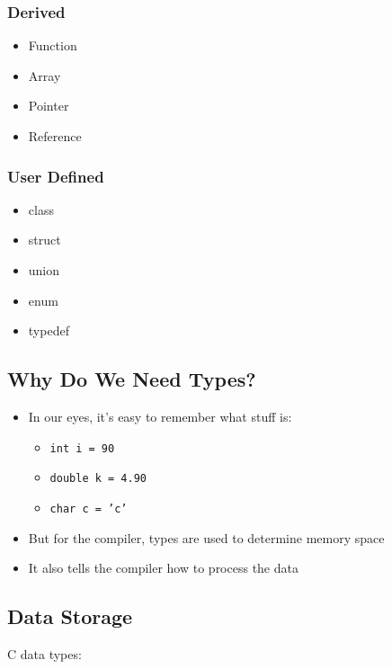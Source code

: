 \documentclass[11pt,a4paper]{article}
\begin{document}
\subsubsection{Derived}
\begin{itemize}
    \item Function
    \item Array
    \item Pointer
    \item Reference
\end{itemize}

\subsubsection{User Defined}
\begin{itemize}
    \item class
    \item struct
    \item union
    \item enum
    \item typedef
\end{itemize}

\subsection{Why Do We Need Types?}

\begin{itemize}
    \item In our eyes, it's easy to remember what stuff is:
    \begin{itemize}
        \item \texttt{int i = 90}
        \item \texttt{double k = 4.90}
        \item \texttt{char c = 'c'}
    \end{itemize}
    \item But for the compiler, types are used to determine memory space
    \item It also tells the compiler how to process the data
\end{itemize}

\subsection{Data Storage}

C data types:
\end{document}
